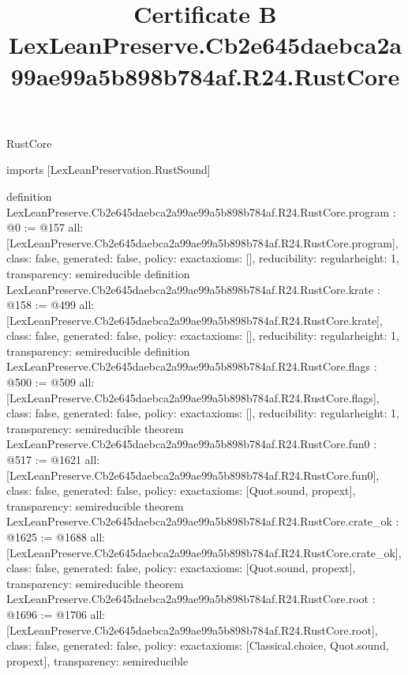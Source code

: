 \begin{lexlean}{RustCore}
\title{Certificate B LexLeanPreserve.Cb2e645daebca2a99ae99a5b898b784af.R24.RustCore}
\begin{coremodule}
imports [LexLeanPreservation.RustSound]

definition LexLeanPreserve.Cb2e645daebca2a99ae99a5b898b784af.R24.RustCore.program : @0 := @157 {
  all: [LexLeanPreserve.Cb2e645daebca2a99ae99a5b898b784af.R24.RustCore.program],
  class: false,
  generated: false,
  policy: exact{axioms: []},
  reducibility: regular{height: 1},
  transparency: semireducible
}
definition LexLeanPreserve.Cb2e645daebca2a99ae99a5b898b784af.R24.RustCore.krate : @158 := @499 {
  all: [LexLeanPreserve.Cb2e645daebca2a99ae99a5b898b784af.R24.RustCore.krate],
  class: false,
  generated: false,
  policy: exact{axioms: []},
  reducibility: regular{height: 1},
  transparency: semireducible
}
definition LexLeanPreserve.Cb2e645daebca2a99ae99a5b898b784af.R24.RustCore.flags : @500 := @509 {
  all: [LexLeanPreserve.Cb2e645daebca2a99ae99a5b898b784af.R24.RustCore.flags],
  class: false,
  generated: false,
  policy: exact{axioms: []},
  reducibility: regular{height: 1},
  transparency: semireducible
}
theorem LexLeanPreserve.Cb2e645daebca2a99ae99a5b898b784af.R24.RustCore.fun0 : @517 := @1621 {
  all: [LexLeanPreserve.Cb2e645daebca2a99ae99a5b898b784af.R24.RustCore.fun0],
  class: false,
  generated: false,
  policy: exact{axioms: [Quot.sound, propext]},
  transparency: semireducible
}
theorem LexLeanPreserve.Cb2e645daebca2a99ae99a5b898b784af.R24.RustCore.crate_ok : @1625 := @1688 {
  all: [LexLeanPreserve.Cb2e645daebca2a99ae99a5b898b784af.R24.RustCore.crate_ok],
  class: false,
  generated: false,
  policy: exact{axioms: [Quot.sound, propext]},
  transparency: semireducible
}
theorem LexLeanPreserve.Cb2e645daebca2a99ae99a5b898b784af.R24.RustCore.root : @1696 := @1706 {
  all: [LexLeanPreserve.Cb2e645daebca2a99ae99a5b898b784af.R24.RustCore.root],
  class: false,
  generated: false,
  policy: exact{axioms: [Classical.choice, Quot.sound, propext]},
  transparency: semireducible
}


\end{coremodule}
\end{lexlean}
